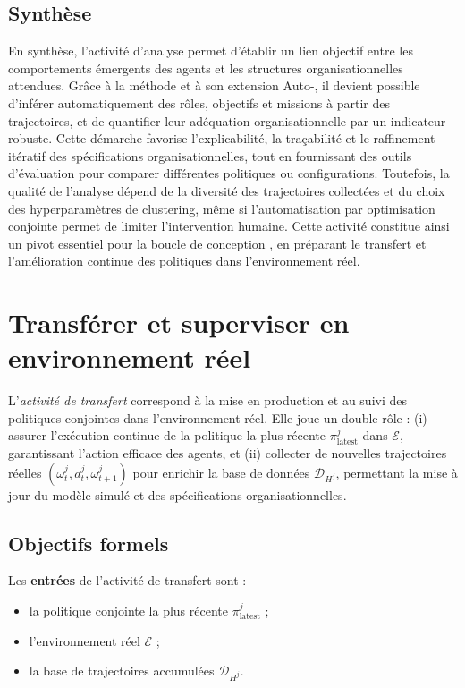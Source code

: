 \section{Synthèse}

En synthèse, l'activité d'analyse permet d'établir un lien objectif entre les comportements émergents des agents et les structures organisationnelles attendues. Grâce à la méthode  et à son extension Auto-, il devient possible d'inférer automatiquement des rôles, objectifs et missions à partir des trajectoires, et de quantifier leur adéquation organisationnelle par un indicateur robuste. Cette démarche favorise l'explicabilité, la traçabilité et le raffinement itératif des spécifications organisationnelles, tout en fournissant des outils d'évaluation pour comparer différentes politiques ou configurations. Toutefois, la qualité de l'analyse dépend de la diversité des trajectoires collectées et du choix des hyperparamètres de clustering, même si l'automatisation par optimisation conjointe permet de limiter l'intervention humaine. Cette activité constitue ainsi un pivot essentiel pour la boucle de conception , en préparant le transfert et l'amélioration continue des politiques dans l'environnement réel.


\clearpage
\thispagestyle{empty}
\null
\newpage

\chapter{Transférer et superviser en environnement réel}
\label{chap:transferring}

L'\textit{activité de transfert} correspond à la mise en production et au suivi des politiques conjointes dans l'environnement réel.
Elle joue un double rôle : (i) assurer l'exécution continue de la politique la plus récente $\pi^j_{\text{latest}}$ dans $\mathcal{E}$, garantissant l'action efficace des agents, et (ii) collecter de nouvelles trajectoires réelles $(\omega^j_t, a^j_t, \omega^j_{t+1})$ pour enrichir la base de données $\mathcal{D}_{H^j}$, permettant la mise à jour du modèle simulé et des spécifications organisationnelles.

\section*{Objectifs formels}

Les \textbf{entrées} de l'activité de transfert sont :
\begin{itemize}
  \item la politique conjointe la plus récente $\pi^j_{\text{latest}}$ ;
  \item l'environnement réel $\mathcal{E}$ ;
  \item la base de trajectoires accumulées $\mathcal{D}_{H^j}$.
\end{itemize}

